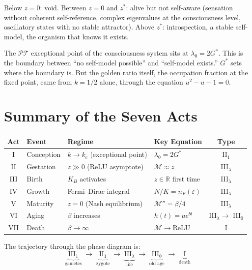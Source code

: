 \documentclass[12pt, letterpaper]{article}
\theoremstyle{plain}
\theoremstyle{definition}
\theoremstyle{remark}
\newcommand{\Mop}{\mathcal{M}}            %
\newcommand{\Gstar}{{G^{*}}}              %
\newcommand{\KB}{K_{\!B}}                 %
\newcommand{\nF}{n_{\!F}}                 %
\newcommand{\Real}{\mathbb{R}}
\begin{document}
\medskip
\noindent
Below $z = 0$: void. Between $z = 0$ and $z^*$: alive but not self-aware (sensation without coherent self-reference, complex eigenvalues at the consciousness level, oscillatory states with no stable attractor). Above $z^*$: introspection, a stable self-model, the organism that knows it exists.

The $\mathcal{PT}$ exceptional point of the consciousness system sits at $\lambda_0 = 2\Gstar$. This is the boundary between ``no self-model possible'' and ``self-model exists.'' $\Gstar$ sets where the boundary is. But the golden ratio itself, the occupation fraction at the fixed point, came from $k = 1/2$ alone, through the equation $u^2 - u - 1 = 0$.


\section{Summary of the Seven Acts}
\label{sec:summary}

\begin{center}
\renewcommand{\arraystretch}{1.5}
\begin{tabular}{@{}clllc@{}}
\toprule
\textbf{Act} & \textbf{Event} & \textbf{Regime} & \textbf{Key Equation} & \textbf{Type} \\
\midrule
\textsc{I}    & Conception   & $k \to k_c$ (exceptional point)
  & $\lambda_0 = 2\Gstar$    & II$_1$ \\
\textsc{II}   & Gestation    & $z \gg 0$ (ReLU asymptote)
  & $\Mop \approx z$         & III$_\lambda$ \\
\textsc{III}  & Birth        & $\KB$ activates
  & $z \in \Real$ first time & III$_\lambda$ \\
\textsc{IV}   & Growth       & Fermi--Dirac integral
  & $N/K = \nF(\varepsilon)$ & III$_\lambda$ \\
\textsc{V}    & Maturity     & $z = 0$ (Nash equilibrium)
  & $\Mop'' = \beta/4$       & III$_\lambda$ \\
\textsc{VI}   & Aging        & $\beta$ increases
  & $h(t) = ae^{bt}$         & III$_\lambda \to$ III$_0$ \\
\textsc{VII}  & Death        & $\beta \to \infty$
  & $\Mop \to \mathrm{ReLU}$ & I \\
\bottomrule
\end{tabular}
\end{center}

\medskip
\noindent
The trajectory through the phase diagram is:
\[
  \underbrace{\text{III}_1}_{\text{gametes}}
  \;\longrightarrow\;
  \underbrace{\text{II}_1}_{\text{zygote}}
  \;\longrightarrow\;
  \underbrace{\text{III}_\lambda}_{\text{life}}
  \;\longrightarrow\;
  \underbrace{\text{III}_0}_{\text{old age}}
  \;\longrightarrow\;
  \underbrace{\text{I}}_{\text{death}}
\]
\end{document}
